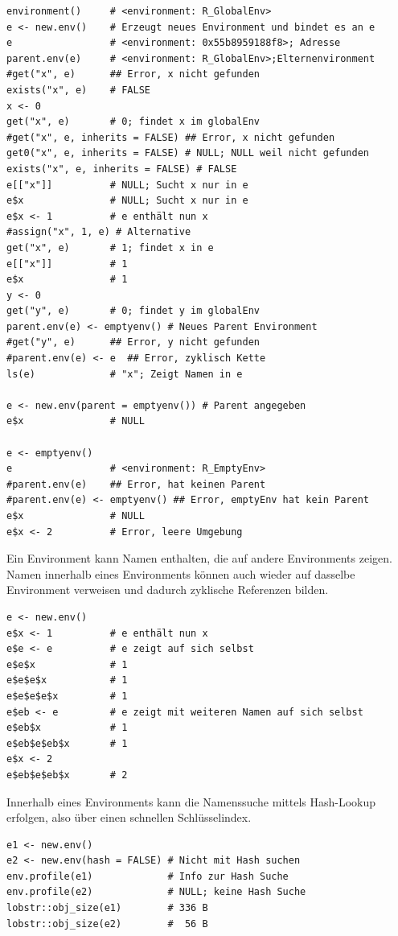 \documentclass[10pt,twocolumn]{scrartcl}
\begin{document}
\begin{lstlisting}
environment()     # <environment: R_GlobalEnv>
e <- new.env()    # Erzeugt neues Environment und bindet es an e
e                 # <environment: 0x55b8959188f8>; Adresse
parent.env(e)     # <environment: R_GlobalEnv>;Elternenvironment
#get("x", e)      ## Error, x nicht gefunden
exists("x", e)    # FALSE
x <- 0
get("x", e)       # 0; findet x im globalEnv
#get("x", e, inherits = FALSE) ## Error, x nicht gefunden
get0("x", e, inherits = FALSE) # NULL; NULL weil nicht gefunden
exists("x", e, inherits = FALSE) # FALSE
e[["x"]]          # NULL; Sucht x nur in e
e$x               # NULL; Sucht x nur in e
e$x <- 1          # e enthält nun x
#assign("x", 1, e) # Alternative
get("x", e)       # 1; findet x in e
e[["x"]]          # 1
e$x               # 1
y <- 0
get("y", e)       # 0; findet y im globalEnv
parent.env(e) <- emptyenv() # Neues Parent Environment
#get("y", e)      ## Error, y nicht gefunden
#parent.env(e) <- e  ## Error, zyklisch Kette
ls(e)             # "x"; Zeigt Namen in e

e <- new.env(parent = emptyenv()) # Parent angegeben
e$x               # NULL

e <- emptyenv()
e                 # <environment: R_EmptyEnv>
#parent.env(e)    ## Error, hat keinen Parent
#parent.env(e) <- emptyenv() ## Error, emptyEnv hat kein Parent
e$x               # NULL
e$x <- 2          # Error, leere Umgebung
\end{lstlisting}

Ein Environment kann Namen enthalten, die auf andere Environments zeigen.
Namen innerhalb eines Environments können auch wieder auf dasselbe Environment verweisen und dadurch zyklische Referenzen bilden.

\begin{lstlisting}
e <- new.env()
e$x <- 1          # e enthält nun x  
e$e <- e          # e zeigt auf sich selbst
e$e$x             # 1
e$e$e$x           # 1
e$e$e$e$x         # 1
e$eb <- e         # e zeigt mit weiteren Namen auf sich selbst
e$eb$x            # 1
e$eb$e$eb$x       # 1
e$x <- 2
e$eb$e$eb$x       # 2
\end{lstlisting}

Innerhalb eines Environments kann die Namenssuche mittels Hash-Lookup erfolgen, also über einen schnellen Schlüsselindex.

\begin{lstlisting}
e1 <- new.env()
e2 <- new.env(hash = FALSE) # Nicht mit Hash suchen
env.profile(e1)             # Info zur Hash Suche
env.profile(e2)             # NULL; keine Hash Suche
lobstr::obj_size(e1)        # 336 B
lobstr::obj_size(e2)        #  56 B
\end{lstlisting}
\end{document}

